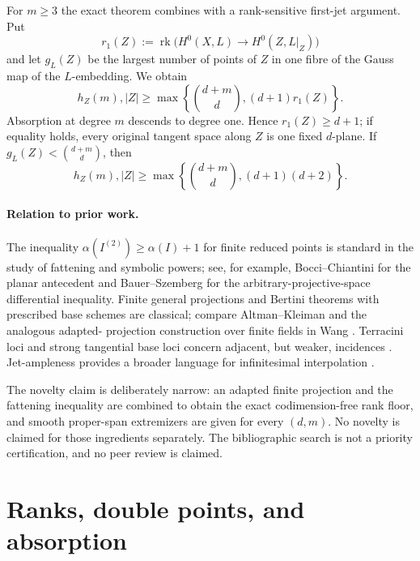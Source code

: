 \documentclass[11pt]{article}
\newcommand{\rk}{\operatorname{rk}}
\begin{document}
For $m\geq3$ the exact theorem combines with a rank-sensitive first-jet
argument.  Put
\[
 r_1(Z):=\rk\bigl(H^0(X,L)\to H^0(Z,L|_Z)\bigr)
\]
and let $g_L(Z)$ be the largest number of points of $Z$ in one fibre of the
Gauss map of the $L$-embedding.  We obtain
\begin{equation}\label{eq:combined-intro}
 h_Z(m),|Z|\geq
 \max\left\{\binom{d+m}{d},(d+1)r_1(Z)\right\}.
\end{equation}
Absorption at degree $m$ descends to degree one.  Hence $r_1(Z)\geq d+1$;
if equality holds, every original tangent space along $Z$ is one fixed
$d$-plane.  If $g_L(Z)<\binom{d+m}{d}$, then
\begin{equation}\label{eq:gauss-intro}
 h_Z(m),|Z|\geq
 \max\left\{\binom{d+m}{d},(d+1)(d+2)\right\}.
\end{equation}

\paragraph{Relation to prior work.}
The inequality $\alpha(I^{(2)})\geq\alpha(I)+1$ for finite reduced points is
standard in the study of fattening and symbolic powers; see, for example,
Bocci--Chiantini \cite[Remark~2.2]{BocciChiantini2011} for the planar
antecedent and Bauer--Szemberg \cite[Lemma~2.4]{BauerSzemberg2014} for the
arbitrary-projective-space differential inequality.  Finite general
projections and Bertini theorems with prescribed base schemes are classical;
compare Altman--Kleiman \cite{AltmanKleiman1979} and the analogous adapted-
projection construction over finite fields in Wang \cite[Lemma~A.7]{Wang2022}.
Terracini loci and strong
tangential base loci concern adjacent, but weaker, incidences
\cite{BallicoChiantini2021,BallicoBrambillaSantarsiero2026}.  Jet-ampleness
provides a broader language for infinitesimal interpolation
\cite{BeltramettiDiRoccoSommese1999}.

The novelty claim is deliberately narrow: an adapted finite projection and
the fattening inequality are combined to obtain the exact codimension-free
rank floor, and smooth proper-span extremizers are given for every $(d,m)$.
No novelty is claimed for those ingredients separately.  The bibliographic
search is not a priority certification, and no peer review is claimed.

\section{Ranks, double points, and absorption}\label{sec:setup}
\end{document}
